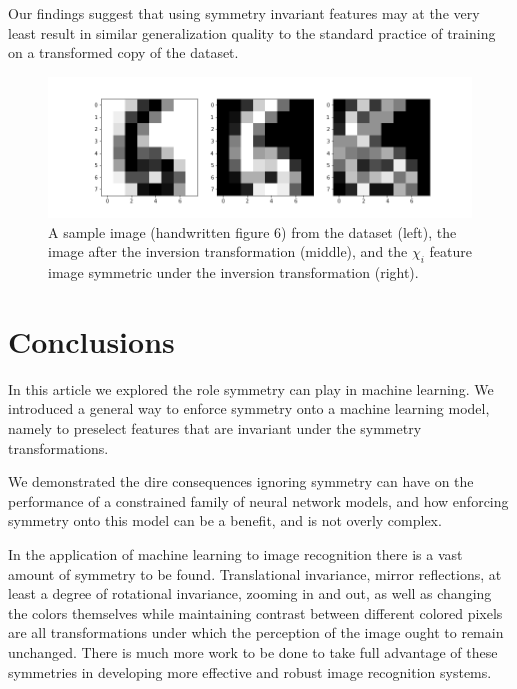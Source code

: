 \documentclass[twocolumn, prl, nofootinbib]{revtex4-1}
\begin{document}
Our findings suggest that using symmetry invariant features may at the very least result in similar generalization quality to the standard practice of training on a transformed copy of the dataset.

\begin{figure}
\centering
\includegraphics[width=1.0\linewidth]{images/six_cubed}
\caption{A sample image (handwritten figure 6) from the dataset (left), the image after the inversion transformation (middle), and the $\chi_i$ feature image symmetric under the inversion transformation (right).}
\label{fig:six_cubed}
\end{figure}





\section{Conclusions}
\label{Sec:conclusions}

In this article we explored the role symmetry can play in machine learning. We introduced a general way to enforce symmetry onto a machine learning model, namely to preselect features that are invariant under the symmetry transformations.

We demonstrated the dire consequences ignoring symmetry can have on the performance of a constrained family of neural network models, and how enforcing symmetry onto this model can be a benefit, and is not overly complex.

In the application of machine learning to image recognition there is a vast amount of symmetry to be found. Translational invariance, mirror reflections, at least a degree of rotational invariance, zooming in and out, as well as changing the colors themselves while maintaining contrast between different colored pixels are all transformations under which the perception of the image ought to remain unchanged. There is much more work to be done to take full advantage of these symmetries in developing more effective and robust image recognition systems.
\end{document}
